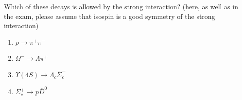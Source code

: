 Which of these decays is allowed by the strong interaction?
(here, as well as in the exam, please assume that isospin is a good symmetry of the strong interaction)
\begin{enumerate}
  \item $\rho \to \pi^+ \pi^-$
  \item $\Omega^- \to \Lambda \pi^+$
  \item $\Upsilon(4S) \to \Lambda_c \overline{\Sigma}_c^-$
  \item $\Sigma_c^+ \to p \overline{D}^0$
\end{enumerate}
